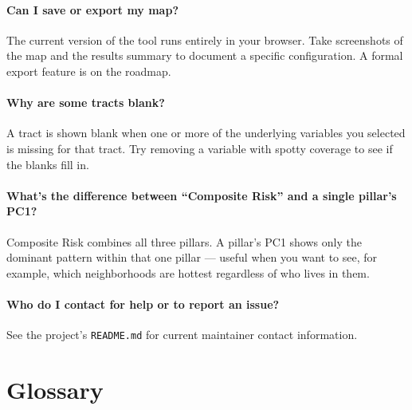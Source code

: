 \documentclass[11pt]{article}
\begin{document}
\paragraph{Can I save or export my map?}
The current version of the tool runs entirely in your browser. Take
screenshots of the map and the results summary to document a specific
configuration. A formal export feature is on the roadmap.

\paragraph{Why are some tracts blank?}
A tract is shown blank when one or more of the underlying variables you
selected is missing for that tract. Try removing a variable with spotty
coverage to see if the blanks fill in.

\paragraph{What's the difference between ``Composite Risk'' and a single
pillar's PC1?}
Composite Risk combines all three pillars. A pillar's PC1 shows only the
dominant pattern within that one pillar --- useful when you want to see,
for example, which neighborhoods are hottest regardless of who lives in
them.

\paragraph{Who do I contact for help or to report an issue?}
See the project's \texttt{README.md} for current maintainer contact
information.

\section{Glossary}
\end{document}
